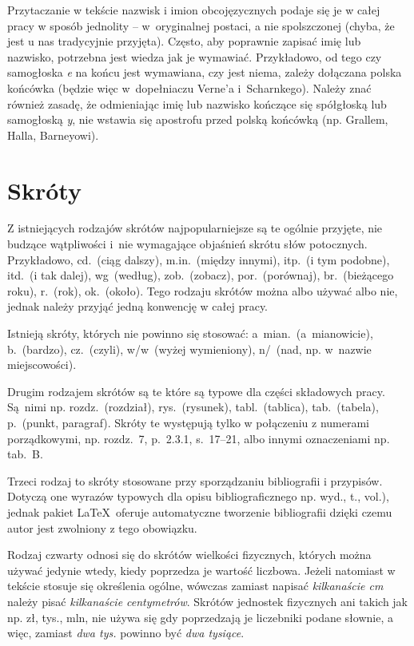 Przytaczanie w tekście nazwisk i imion obcojęzycznych podaje się je w całej pracy w sposób jednolity -- w~oryginalnej postaci, a nie spolszczonej (chyba, że jest u nas tradycyjnie przyjęta). Często, aby poprawnie zapisać imię lub nazwisko, potrzebna jest wiedza jak je wymawiać. Przykładowo, od tego czy samogłoska \textit{e} na końcu jest wymawiana, czy jest niema, zależy dołączana polska końcówka (będzie więc w~dopełniaczu Verne'a i~Scharnkego). Należy znać również zasadę, że odmieniając imię lub nazwisko kończące się spółgłoską lub samogłoską \textit{y}, nie wstawia się apostrofu przed polską końcówką (np. Grallem, Halla, Barneyowi).
\section{Skróty}
Z istniejących rodzajów skrótów najpopularniejsze są te ogólnie przyjęte, nie budzące wątpliwości i~nie wymagające objaśnień skrótu słów potocznych. Przykładowo, cd.~(ciąg dalszy), m.in.~(między innymi), itp.~(i tym podobne), itd.~(i tak dalej), wg~(według), zob.~(zobacz), por.~(porównaj), br.~(bieżącego roku), r.~(rok), ok.~(około). Tego rodzaju skrótów można albo używać albo nie, jednak należy przyjąć jedną konwencję w całej pracy.

Istnieją skróty, których nie powinno się stosować: a~mian.~(a~mianowicie), b.~(bardzo), cz.~(czyli), w/w~(wyżej wymieniony), n/~(nad, np. w~nazwie miejscowości).

Drugim rodzajem skrótów są te które są typowe dla części składowych pracy. Są~nimi np. rozdz.~(rozdział), rys.~(rysunek), tabl.~(tablica), tab.~(tabela), p.~(punkt, paragraf). Skróty te występują tylko w połączeniu z numerami porządkowymi, np. rozdz.~7, p.~2.3.1, s.~17--21, albo innymi oznaczeniami np. tab.~B.

Trzeci rodzaj to skróty stosowane przy sporządzaniu bibliografii i przypisów. Dotyczą one wyrazów typowych dla opisu bibliograficznego np. wyd., t., vol.), jednak pakiet \LaTeX\  oferuje automatyczne tworzenie bibliografii dzięki czemu autor jest zwolniony z tego obowiązku.

Rodzaj czwarty odnosi się do skrótów wielkości fizycznych, których można używać jedynie wtedy, kiedy poprzedza je wartość liczbowa. Jeżeli natomiast w tekście stosuje się określenia ogólne, wówczas zamiast napisać \textit{kilkanaście cm} należy pisać \textit{kilkanaście centymetrów}. Skrótów jednostek fizycznych ani takich jak np. zł, tys., mln, nie używa się gdy poprzedzają je liczebniki podane słownie, a więc, zamiast \textit{dwa tys.} powinno być \textit{dwa tysiące}.


